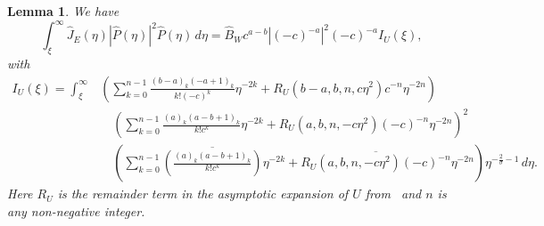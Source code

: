 \documentclass[11pt]{article}
\newcommand{\conj}[1]{\overline{#1}}
\newtheorem{lemma}[definition]{Lemma}
\begin{document}
\begin{lemma}\label{lemma:integral-J_E-hat-P-hat}
  We have
  \begin{equation*}
    \int_{\xi}^{\infty} \hat{J}_{E}(\eta)|\hat{P}(\eta)|^{2}\hat{P}(\eta)\,d\eta
    = \hat{B}_{W}c^{a - b}|(-c)^{-a}|^{2}(-c)^{-a}I_{U}(\xi),
  \end{equation*}
  with
  \begin{equation*}
    \begin{split}
      I_{U}(\xi)
      = \int_{\xi}^{\infty}
      &\left(
        \sum_{k = 0}^{n - 1} \frac{(b - a)_{k}(-a + 1)_{k}}{k!(-c)^{k}}\eta^{-2k}
        + R_{U}(b - a, b, n, c\eta^{2})c^{-n}\eta^{-2n}
        \right)\\
      &\quad\left(
        \sum_{k = 0}^{n - 1} \frac{(a)_{k}(a - b + 1)_{k}}{k!c^{k}}\eta^{-2k}
        + R_{U}(a, b, n, -c\eta^{2})(-c)^{-n}\eta^{-2n}
        \right)^{2}\\
      &\quad\left(
        \sum_{k = 0}^{n - 1} \conj{\left(\frac{(a)_{k}(a - b + 1)_{k}}{k!c^{k}}\right)}\eta^{-2k}
        + \conj{R_{U}(a, b, n, -c\eta^{2})(-c)^{-n}}\eta^{-2n}
        \right)\eta^{-\frac{2}{\sigma} - 1}\,d\eta.
    \end{split}
  \end{equation*}
  Here \(R_{U}\) is the remainder term in the asymptotic expansion of
  \(U\) from~\cite[Lemma~7.1]{Dahne2024} and \(n\) is any
  non-negative integer.
\end{lemma}
\end{document}
